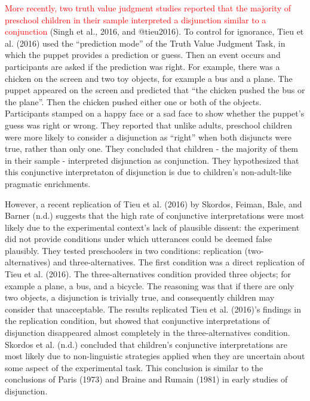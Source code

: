 \documentclass[,man,floatsintext]{apa6}
\begin{document}
\textcolor{red}{More recently, two truth value judgment studies reported that the majority of preschool children in their sample interpreted a disjunction similar to a conjunction} (Singh et al., 2016, and @tieu2016). To control for ignorance, Tieu et al. (2016) used the \enquote{prediction mode} of the Truth Value Judgment Task, in which the puppet provides a prediction or guess. Then an event occurs and participants are asked if the prediction was right. For example, there was a chicken on the screen and two toy objects, for example a bus and a plane. The puppet appeared on the screen and predicted that \enquote{the chicken pushed the bus or the plane}. Then the chicken pushed either one or both of the objects. Participants stamped on a happy face or a sad face to show whether the puppet's guess was right or wrong. They reported that unlike adults, preschool children were more likely to consider a disjunction as \enquote{right} when both disjuncts were true, rather than only one. They concluded that children - the majority of them in their sample - interpreted disjunction as conjunction. They hypothesized that this conjunctive interpretaton of disjunction is due to children's non-adult-like pragmatic enrichments.

However, a recent replication of Tieu et al. (2016) by Skordos, Feiman, Bale, and Barner (n.d.) suggests that the high rate of conjunctive interpretations were most likely due to the experimental context's lack of plausible dissent: the experiment did not provide conditions under which utterances could be deemed false plausibly. They tested preschoolers in two conditions: replication (two-alternatives) and three-alternatives. The first condition was a direct replication of Tieu et al. (2016). The three-alternatives condition provided three objects; for example a plane, a bus, and a bicycle. The reasoning was that if there are only two objects, a disjunction is trivially true, and consequently children may consider that unacceptable. The results replicated Tieu et al. (2016)'s findings in the replication condition, but showed that conjunctive interpretations of disjunction disappeared almost completely in the three-alternatives condition. Skordos et al. (n.d.) concluded that children's conjunctive interpretations are most likely due to non-linguistic strategies applied when they are uncertain about some aspect of the experimental task. This conclusion is similar to the conclusions of Paris (1973) and Braine and Rumain (1981) in early studies of disjunction.
\end{document}
